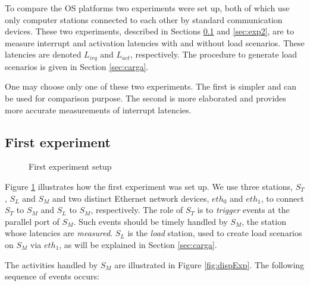 \documentclass{acm_proc_article-sp}
\begin{document}
To compare the OS platforms two experiments were set up, both of which use
only computer stations connected to each other by standard communication
devices. These two experiments, described in Sections \ref{sec:exp1} and
\ref{sec:exp2}, are to measure interrupt and activation latencies with and without
load scenarios.  These latencies are denoted $L_{irq}$ and $L_{act}$,
respectively. The procedure to generate load scenarios is given in Section
\ref{sec:carga}. 

One may choose only one of these two experiments. The first is simpler and can
be used for comparison purpose. The second is more elaborated and provides
more accurate measurements of interrupt latencies.

\subsection{First experiment}
\label{sec:exp1}

\begin{figure}[h]
  \centering {\scalebox{0.67}{}}
  \caption{First experiment setup}
  \label{fig:config}
\end{figure}

Figure \ref{fig:config} illustrates how the first experiment was set up. We use 
three stations, $S_T$, $S_L$ and $S_M$ and two distinct Ethernet
network devices, $eth_0$ and $eth_1$, to connect $S_T$ to $S_M$ and $S_L$
to $S_M$, respectively. The role of $S_T$ is to \emph{trigger} events at the
parallel port of $S_M$. Such events should be timely handled by $S_M$, the station
whose latencies are \emph{measured}.  $S_L$ is the \emph{load} station, used to
create load scenarios on $S_M$ via $eth_1$, as will be explained in Section
\ref{sec:carga}.

The activities handled by $S_M$ are illustrated in Figure \ref{fig:dispExp}. The
following sequence of events occurs:
\end{document}
